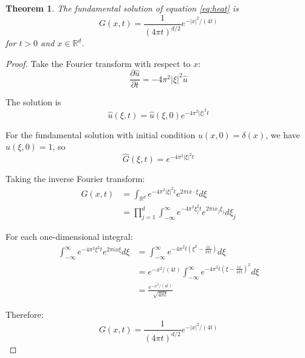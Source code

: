 \documentclass{article}
\newtheorem{theorem}{Theorem}
\begin{document}
\begin{theorem}
The fundamental solution of equation \eqref{eq:heat} is
\begin{equation}
\label{eq:heat_kernel}
G(x,t) = \frac{1}{(4\pi t)^{d/2}} e^{-|x|^2/(4t)}
\end{equation}
for $t > 0$ and $x \in \mathbb{R}^d$.
\end{theorem}

\begin{proof}
Take the Fourier transform with respect to $x$:
\begin{equation}
\label{eq:fourier_heat}
\frac{\partial \hat{u}}{\partial t} = -4\pi^2 |\xi|^2 \hat{u}
\end{equation}

The solution is
\begin{equation}
\label{eq:fourier_solution}
\hat{u}(\xi, t) = \hat{u}(\xi, 0) e^{-4\pi^2 |\xi|^2 t}
\end{equation}

For the fundamental solution with initial condition $u(x,0) = \delta(x)$, we have $\hat{u}(\xi,0) = 1$, so
\begin{equation}
\label{eq:fundamental_fourier}
\hat{G}(\xi, t) = e^{-4\pi^2 |\xi|^2 t}
\end{equation}

Taking the inverse Fourier transform:
\begin{align}
G(x,t) &= \int_{\mathbb{R}^d} e^{-4\pi^2 |\xi|^2 t} e^{2\pi i x \cdot \xi} d\xi \label{eq:inverse_transform}\\
&= \prod_{j=1}^d \int_{-\infty}^{\infty} e^{-4\pi^2 \xi_j^2 t} e^{2\pi i x_j \xi_j} d\xi_j \label{eq:product_form}
\end{align}

For each one-dimensional integral:
\begin{align}
\int_{-\infty}^{\infty} e^{-4\pi^2 \xi^2 t} e^{2\pi i x \xi} d\xi &= \int_{-\infty}^{\infty} e^{-4\pi^2 t(\xi^2 - \frac{ix}{2\pi t})} d\xi \label{eq:completing_square}\\
&= e^{-x^2/(4t)} \int_{-\infty}^{\infty} e^{-4\pi^2 t(\xi - \frac{ix}{4\pi t})^2} d\xi \label{eq:completed_square}\\
&= \frac{e^{-x^2/(4t)}}{\sqrt{4\pi t}} \label{eq:gaussian_integral}
\end{align}

Therefore:
\begin{equation}
\label{eq:final_kernel}
G(x,t) = \frac{1}{(4\pi t)^{d/2}} e^{-|x|^2/(4t)}
\end{equation}
\end{proof}
\end{document}
